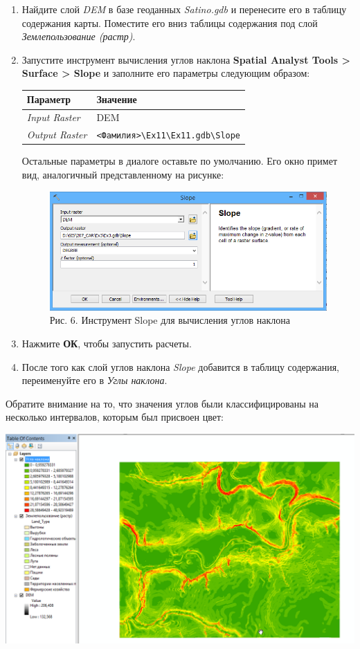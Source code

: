 \documentclass[]{book}
\theoremstyle{definition}
\theoremstyle{definition}
\theoremstyle{definition}
\theoremstyle{remark}
\begin{document}
\begin{enumerate}
\def\labelenumi{\arabic{enumi}.}
\item
  Найдите слой \emph{DEM} в базе геоданных \emph{Satino.gdb} и
  перенесите его в таблицу содержания карты. Поместите его вниз таблицы
  содержания под слой \emph{Землепользование (растр)}.
\item
  Запустите инструмент вычисления углов наклона \textbf{Spatial Analyst
  Tools \textgreater{} Surface \textgreater{} Slope} и заполните его
  параметры следующим образом:

  \begin{longtable}[]{@{}ll@{}}
  \toprule
  Параметр & Значение\tabularnewline
  \midrule
  \endhead
  \emph{Input Raster} & DEM\tabularnewline
  \emph{Output Raster} &
  \texttt{\textless{}Фамилия\textgreater{}\textbackslash{}Ex11\textbackslash{}Ex11.gdb\textbackslash{}Slope}\tabularnewline
  \bottomrule
  \end{longtable}

  Остальные параметры в диалоге оставьте по умолчанию. Его окно примет
  вид, аналогичный представленному на рисунке:

  \begin{figure}
  \centering
  \includegraphics{images/Ex11/image7.png}
  \caption{Рис. 6. Инструмент Slope для вычисления углов наклона}
  \end{figure}
\item
  Нажмите \textbf{ОК}, чтобы запустить расчеты.
\item
  После того как слой углов наклона \emph{Slope} добавится в таблицу
  содержания, переименуйте его в \emph{Углы наклона}.
\end{enumerate}

Обратите внимание на то, что значения углов были классифицированы на
несколько интервалов, которым был присвоен цвет:

\includegraphics{images/Ex11/image8.png}
\end{document}
